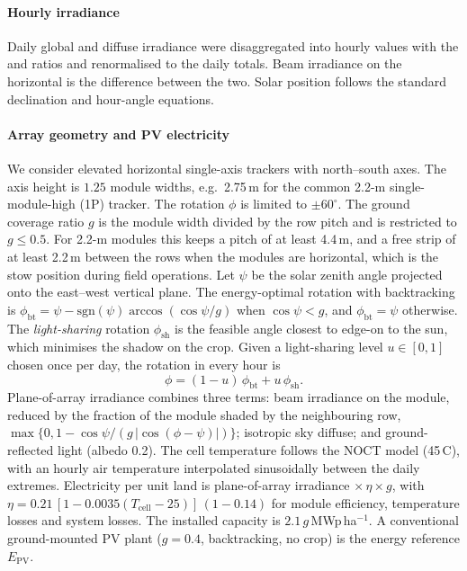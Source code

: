 \paragraph{Hourly irradiance}
Daily global and diffuse irradiance were disaggregated into hourly values with the \citet{collares1979} and \citet{liu1960} ratios and renormalised to the daily totals. Beam irradiance on the horizontal is the difference between the two. Solar position follows the standard declination and hour-angle equations.

\paragraph{Array geometry and PV electricity}
We consider elevated horizontal single-axis trackers with north--south axes. The axis height is $1.25$ module widths, e.g.\ 2.75\,m for the common 2.2-m single-module-high (1P) tracker. The rotation $\phi$ is limited to $\pm60^\circ$. The ground coverage ratio $g$ is the module width divided by the row pitch and is restricted to $g\le0.5$. For 2.2-m modules this keeps a pitch of at least 4.4\,m, and a free strip of at least 2.2\,m between the rows when the modules are horizontal, which is the stow position during field operations. Let $\psi$ be the solar zenith angle projected onto the east--west vertical plane. The energy-optimal rotation with backtracking \citep{lorenzo2011,marion2013} is $\phi_{\mathrm{bt}}=\psi-\mathrm{sgn}(\psi)\arccos(\cos\psi/g)$ when $\cos\psi<g$, and $\phi_{\mathrm{bt}}=\psi$ otherwise. The \emph{light-sharing} rotation $\phi_{\mathrm{sh}}$ is the feasible angle closest to edge-on to the sun, which minimises the shadow on the crop. Given a light-sharing level $u\in[0,1]$ chosen once per day, the rotation in every hour is
\begin{equation}
\phi = (1-u)\,\phi_{\mathrm{bt}} + u\,\phi_{\mathrm{sh}}.
\label{eq:phi}
\end{equation}
Plane-of-array irradiance combines three terms: beam irradiance on the module, reduced by the fraction of the module shaded by the neighbouring row, $\max\{0,1-\cos\psi/(g\,|\cos(\phi-\psi)|)\}$; isotropic sky diffuse; and ground-reflected light (albedo 0.2). The cell temperature follows the NOCT model (45\,\textdegree C), with an hourly air temperature interpolated sinusoidally between the daily extremes. Electricity per unit land is plane-of-array irradiance $\times\,\eta\times g$, with $\eta=0.21\,[1-0.0035(T_{\mathrm{cell}}-25)]\,(1-0.14)$ for module efficiency, temperature losses and system losses. The installed capacity is $2.1\,g$\,MWp\,ha$^{-1}$. A conventional ground-mounted PV plant ($g=0.4$, backtracking, no crop) is the energy reference $E_{\mathrm{PV}}$.

